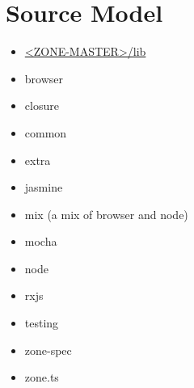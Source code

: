 \section{Source Model}


\begin{itemize}
  \item \href{https://github.com/angular/zone.js/tree/master/lib}
        {<ZONE-MASTER>/lib}
\end{itemize}


\begin{itemize}
  \item browser
  \item closure
  \item common
  \item extra
  \item jasmine
  \item mix (a mix of browser and node)
  \item mocha
  \item node
  \item rxjs
  \item testing
  \item zone-spec
\end{itemize}


\begin{itemize}
  \item zone.ts
\end{itemize}







